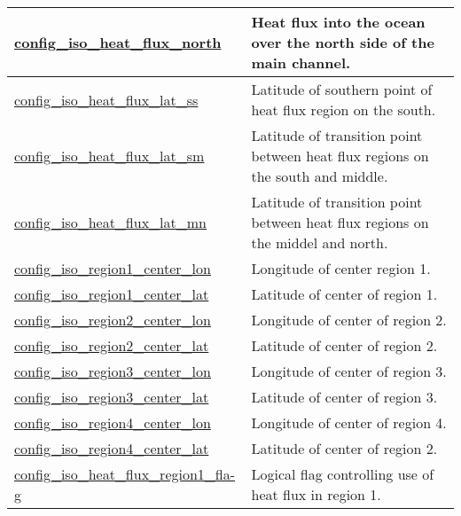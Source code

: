 {\begin{center}
\begin{longtable}{| p{2.0in} || p{4.0in} |}
    \hline
    \hyperref[subsec:nm_sec_config_iso_heat_flux_north]{config\_iso\_heat\_flux\_north} & Heat flux into the ocean over the north side of the main channel. \\
    \hline
    \hyperref[subsec:nm_sec_config_iso_heat_flux_lat_ss]{config\_iso\_heat\_flux\_lat\_ss} & Latitude of southern point of heat flux region on the south. \\
    \hline
    \hyperref[subsec:nm_sec_config_iso_heat_flux_lat_sm]{config\_iso\_heat\_flux\_lat\_sm} & Latitude of transition point between heat flux regions on the south and middle. \\
    \hline
    \hyperref[subsec:nm_sec_config_iso_heat_flux_lat_mn]{config\_iso\_heat\_flux\_lat\_mn} & Latitude of transition point between heat flux regions on the middel and north. \\
    \hline
    \hyperref[subsec:nm_sec_config_iso_region1_center_lon]{config\_iso\_region1\_center\_lon} & Longitude of center region 1. \\
    \hline
    \hyperref[subsec:nm_sec_config_iso_region1_center_lat]{config\_iso\_region1\_center\_lat} & Latitude of center of region 1. \\
    \hline
    \hyperref[subsec:nm_sec_config_iso_region2_center_lon]{config\_iso\_region2\_center\_lon} & Longitude of center of region 2. \\
    \hline
    \hyperref[subsec:nm_sec_config_iso_region2_center_lat]{config\_iso\_region2\_center\_lat} & Latitude of center of region 2. \\
    \hline
    \hyperref[subsec:nm_sec_config_iso_region3_center_lon]{config\_iso\_region3\_center\_lon} & Longitude of center of region 3. \\
    \hline
    \hyperref[subsec:nm_sec_config_iso_region3_center_lat]{config\_iso\_region3\_center\_lat} & Latitude of center of region 3. \\
    \hline
    \hyperref[subsec:nm_sec_config_iso_region4_center_lon]{config\_iso\_region4\_center\_lon} & Longitude of center of region 4. \\
    \hline
    \hyperref[subsec:nm_sec_config_iso_region4_center_lat]{config\_iso\_region4\_center\_lat} & Latitude of center of region 2. \\
    \hline
    \hyperref[subsec:nm_sec_config_iso_heat_flux_region1_flag]{config\_iso\_heat\_flux\_region1\_fla-}\hyperref[subsec:nm_sec_config_iso_heat_flux_region1_flag]{g}& Logical flag controlling use of heat flux in region 1. \\

\end{longtable}
\end{center}}
